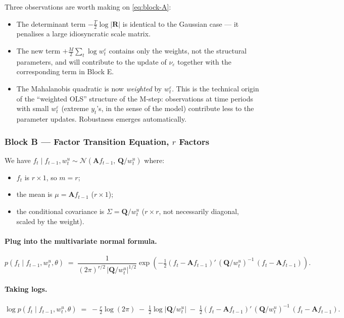 \documentclass[11pt, a4paper, oneside]{article}
\newcommand{\mA}{\mathbf{A}}
\newcommand{\mR}{\mathbf{R}}
\newcommand{\mQ}{\mathbf{Q}}
\begin{document}
Three observations are worth making on \eqref{eq:block-A}:
\begin{itemize}[leftmargin=1.5em, itemsep=3pt]
    \item The determinant term $-\tfrac{T}{2}\log|\mR|$ is identical to
          the Gaussian case — it penalises a large idiosyncratic scale
          matrix.
    \item The new term $+\tfrac{M}{2}\sum_t \log w^\varepsilon_t$
          contains only the weights, not the structural parameters, and
          will contribute to the update of $\nu_\varepsilon$ together
          with the corresponding term in Block E.
    \item The Mahalanobis quadratic is now \emph{weighted} by
          $w^\varepsilon_t$. This is the technical origin of the
          ``weighted OLS'' structure of the M-step: observations at
          time periods with small $w^\varepsilon_t$ (extreme $y_t$'s,
          in the sense of the model) contribute less to the parameter
          updates. Robustness emerges automatically.
\end{itemize}

\subsubsection*{Block B — Factor Transition Equation, $r$ Factors}

We have $f_t \mid f_{t-1}, w^u_t \sim \mathcal{N}(\mA f_{t-1},\, \mQ/w^u_t)$
where:
\begin{itemize}[leftmargin=1.5em, itemsep=2pt]
    \item $f_t$ is $r \times 1$, so $m = r$;
    \item the mean is $\mu = \mA f_{t-1}$ ($r \times 1$);
    \item the conditional covariance is $\Sigma = \mQ/w^u_t$
          ($r \times r$, not necessarily diagonal, scaled by the weight).
\end{itemize}

\paragraph{Plug into the multivariate normal formula.}
\[
p(f_t \mid f_{t-1}, w^u_t, \theta)
\;=\; \frac{1}{(2\pi)^{r/2}\, \big|\mQ/w^u_t\big|^{1/2}}
\exp\!\left(-\tfrac{1}{2}(f_t - \mA f_{t-1})'\,(\mQ/w^u_t)^{-1}\,(f_t - \mA f_{t-1})\right).
\]

\paragraph{Taking logs.}
\[
\log p(f_t \mid f_{t-1}, w^u_t, \theta)
\;=\; -\tfrac{r}{2}\log(2\pi) \;-\; \tfrac{1}{2}\log\!\big|\mQ/w^u_t\big|
\;-\; \tfrac{1}{2}(f_t - \mA f_{t-1})'\,(\mQ/w^u_t)^{-1}\,(f_t - \mA f_{t-1}).
\]
\end{document}
